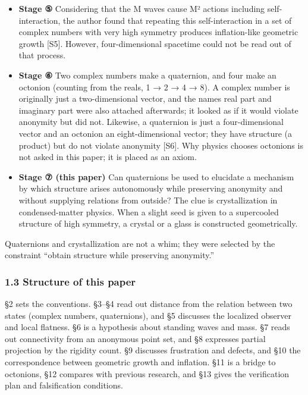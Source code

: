 \documentclass[
  a4paper,
]{article}
\begin{document}
\begin{itemize}
  network, and a method of reading out structure from the M = N(N−1)/2
  relations for N vertices was examined {[}S4{]}. However, which vertex
  relates to which must be supplied from outside, which violates
  anonymity.
\item
  \textbf{Stage ⑤} Considering that the M waves cause M² actions
  including self-interaction, the author found that repeating this
  self-interaction in a set of complex numbers with very high symmetry
  produces inflation-like geometric growth {[}S5{]}. However,
  four-dimensional spacetime could not be read out of that process.
\item
  \textbf{Stage ⑥} Two complex numbers make a quaternion, and four make
  an octonion (counting from the reals, 1 → 2 → 4 → 8). A complex number
  is originally just a two-dimensional vector, and the names real part
  and imaginary part were also attached afterwards; it looked as if it
  would violate anonymity but did not. Likewise, a quaternion is just a
  four-dimensional vector and an octonion an eight-dimensional vector;
  they have structure (a product) but do not violate anonymity {[}S6{]}.
  Why physics chooses octonions is not asked in this paper; it is placed
  as an axiom.
\item
  \textbf{Stage ⑦ (this paper)} Can quaternions be used to elucidate a
  mechanism by which structure arises autonomously while preserving
  anonymity and without supplying relations from outside? The clue is
  crystallization in condensed-matter physics. When a slight seed is
  given to a supercooled structure of high symmetry, a crystal or a
  glass is constructed geometrically.
\end{itemize}

Quaternions and crystallization are not a whim; they were selected by
the constraint ``obtain structure while preserving anonymity.''

\subsubsection{1.3 Structure of this
paper}\label{structure-of-this-paper}

§2 sets the conventions. §3--§4 read out distance from the relation
between two states (complex numbers, quaternions), and §5 discusses the
localized observer and local flatness. §6 is a hypothesis about standing
waves and mass. §7 reads out connectivity from an anonymous point set,
and §8 expresses partial projection by the rigidity count. §9 discusses
frustration and defects, and §10 the correspondence between geometric
growth and inflation. §11 is a bridge to octonions, §12 compares with
previous research, and §13 gives the verification plan and falsification
conditions.
\end{document}
